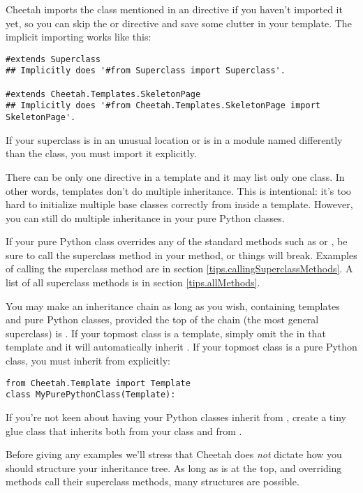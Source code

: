 Cheetah imports the class mentioned in an
 directive if you haven't imported it yet, so you can skip the
 or  directive and save some clutter in your
template.  The implicit importing works like this:

\begin{verbatim}
#extends Superclass   
## Implicitly does '#from Superclass import Superclass'.

#extends Cheetah.Templates.SkeletonPage
## Implicitly does '#from Cheetah.Templates.SkeletonPage import SkeletonPage'.
\end{verbatim}

If your superclass is in an unusual location or is in a module named 
differently than the class, you must import it explicitly.

There can be only one  directive in a template and it
may list only one class.  In other words, templates don't do multiple
inheritance.  This is intentional: it's too hard to initialize multiple
base classes correctly from inside a template.  However, you can still do
multiple inheritance in your pure Python classes.

If your pure Python class overrides any of the standard 
methods such as  or , be sure to call
the superclass method in your method, or things will break.  Examples of calling
the superclass method are in section \ref{tips.callingSuperclassMethods}.
A list of all superclass methods is in section 
\ref{tips.allMethods}.

You may make an inheritance chain as long as you wish, containing templates and
pure Python classes, provided the top of the chain (the most general
superclass) is .  If your topmost class is a template, simply
omit the  in that template and it will automatically inherit
.  If your topmost class is a pure Python class, you must
inherit from  explicitly:
\begin{verbatim}
from Cheetah.Template import Template
class MyPurePythonClass(Template):
\end{verbatim}

If you're not keen about having your Python classes inherit from
, create a tiny glue class that inherits both from your
class and from .

Before giving any examples we'll stress that Cheetah does {\em not}
dictate how you should structure your inheritance tree.  As long as
 is at the top, and overriding methods call their
superclass methods, many structures are possible.


